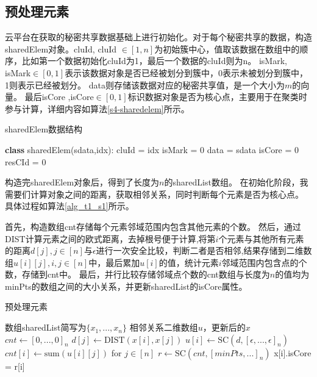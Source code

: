 \subsection{预处理元素}
云平台在获取的秘密共享数据基础上进行初始化。对于每个秘密共享的数据，构造sharedElem对象。cluId, cluId $ \in [1, n]$为初始簇中心，值取该数据在数组中的顺序，比如第一个数据初始化cluId为1，最后一个数据的cluId则为n。
isMark, isMark$ \in [0,1] $表示该数据对象是否已经被划分到簇中，0表示未被划分到簇中，1则表示已经被划分。
data则存储该数据对应的秘密共享值，是一个大小为$ m $的向量。
最后isCore ,isCore$ \in[0,1]$标识数据对象是否为核心点，主要用于在聚类时参与计算，详细内容如算法\ref{s4-sharedelem}所示。
\begin{algorithm}
	\caption{sharedElem数据结构}
	\label{s4-sharedelem}
	\begin{algorithmic}[1]
		\STATE \textbf{class} sharedElem(sdata,idx):
		\STATE \hspace{\algorithmicindent} cluId = idx
		\STATE \hspace{\algorithmicindent} isMark = 0
		\STATE \hspace{\algorithmicindent} data = sdata
		\STATE \hspace{\algorithmicindent} isCore = 0
		\STATE \hspace{\algorithmicindent} resCId = 0
	\end{algorithmic}
\end{algorithm}

构造完sharedElem对象后，得到了长度为$ n $的sharedList数组。
在初始化阶段，我需要们计算对象之间的距离，获取相邻关系，同时判断每个元素是否为核心点。
具体过程如算法\ref{alg_t1_s1}所示。

首先，构造数组cnt存储每个元素邻域范围内包含其他元素的个数。
然后，通过DIST计算元素之间的欧式距离，去掉根号便于计算,将第$ i $个元素与其他所有元素的距离$ d[j],j\in[n] $与$ \epsilon $进行一次安全比较，判断二者是否相邻,结果存储到二维数组$ u[i][j],i,j\in[n] $中，最后累加$ u[i]$的值，统计元素$ i $邻域范围内包含点的个数，存储到cnt中。
最后，并行比较存储邻域点个数的cnt数组与长度为$ n $的值均为minPts的数组之间的大小关系，并更新sharedList的isCore属性。

\begin{algorithm}[htbp]
	\renewcommand{\algorithmicrequire}{\textbf{输入:}}
	\renewcommand{\algorithmicensure}{\textbf{输出:}}
	\caption{预处理元素}
	\label{alg_t1_s1}
	\begin{algorithmic}[1]
		\REQUIRE 数组sharedList简写为$ \{x_1,...,x_n\} $
		\ENSURE 相邻关系二维数组$ u $，更新后的$ x $
		\STATE $ cnt \leftarrow [0,...,0]_n $
		\STATE $ d[j] \leftarrow \text{DIST}(x[i], x[j]) $
		\ENDFOR
		\STATE $ u[i] \leftarrow \text{SC}(d, [\epsilon,...,\epsilon]_n) $
		\STATE $ cnt[i] \leftarrow \text{sum}(u[i][j])$ for $j \in [n] $
		\ENDFOR
		\STATE $ r \leftarrow \text{SC}(cnt, [minPts,...]_n) $
		\STATE x[i].isCore = r[i]
		\ENDFOR
	\end{algorithmic}
\end{algorithm}

